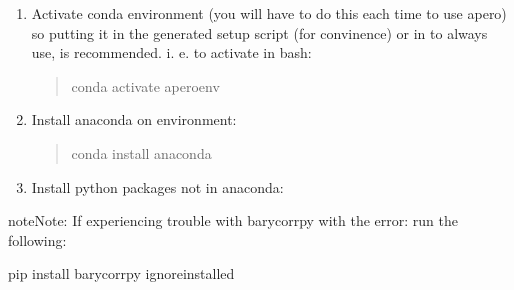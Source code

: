 \documentclass[a4paper,10pt,english]{report}
\begin{document}
\begin{enumerate}
\item {} 
Activate conda environment (you will have to do this each time to use apero)
so putting it in the generated setup script (for convinence) or in
  to always use, is recommended.
i. e. to activate in bash:
\begin{quote}

\begin{sphinxVerbatim}[commandchars=\\\{\}]
conda activate aperoenv
\end{sphinxVerbatim}
\end{quote}

\item {} 
Install anaconda on environment:
\begin{quote}

\begin{sphinxVerbatim}[commandchars=\\\{\}]
conda install anaconda
\end{sphinxVerbatim}
\end{quote}

\item {} 
Install python packages not in anaconda:
\begin{quote}

\begin{sphinxVerbatim}[commandchars=\\\{\}]
  
  
  
  
  
\end{sphinxVerbatim}
\end{quote}

\end{enumerate}

\begin{sphinxadmonition}{note}{Note:}
If experiencing trouble with barycorrpy with the error:
 run the following:

\begin{sphinxVerbatim}[commandchars=\\\{\}]
pip install barycorrpy \PYGZhy{}\PYGZhy{}ignore\PYGZhy{}installed
\end{sphinxVerbatim}
\end{sphinxadmonition}
\end{document}
